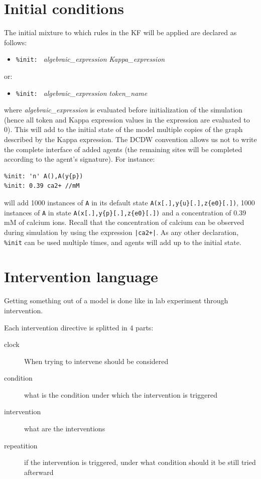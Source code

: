 \documentclass[11pt]{book}
\def\ttt#1{\texttt{#1}}
\def\ITE#1{\begin{itemize}#1\end{itemize}}
\begin{document}
\section{Initial conditions}\label{sec:init}

The initial mixture to which rules in the
KF will be applied are declared as follows: \ITE{
\item[] \ttt{\%init: } \textit{algebraic\_expression} \textit{Kappa\_expression}
}
or:
\ITE{
\item[] \ttt{\%init: }  \textit{algebraic\_expression} \textit{token\_name}
}

where \textit{algebraic\_expression} is evaluated before
initialization of the simulation (hence all token and Kappa expression
values in the expression are evaluated to 0). This will add to the
initial state of the model multiple copies of the graph described by
the Kappa expression. The DCDW convention allows us not to write the complete interface of added agents
(the remaining sites will be completed according to the agent's
signature). For instance:
\begin{lstlisting}[language=kappa]
%var: 'n' 1000
%init: 'n' A(),A(y{p})
%init: 0.39 ca2+ //mM
\end{lstlisting}
will add 1000 instances of \ttt{A} in its default state
\ttt{A(x[.],y\{u\}[.],z\{e0\}[.])}, 1000 instances of \ttt{A} in
state \ttt{A(x[.],y\{p\}[.],z\{e0\}[.])} and a concentration of 0.39
mM of calcium ions. Recall that the concentration of calcium can be
observed during simulation by using the expression \ttt{|ca2+|}.  As
any other declaration, \ttt{\%init} can be used
multiple times, and agents will add up to the initial state.

\section{Intervention language}\label{sec:mod}
Getting something out of a model is done like in lab experiment
through intervention.

Each intervention directive is splitted in 4 parts:
\begin{description}
\item[clock] When trying to intervene should be considered
\item[condition] what is the condition under which the intervention is triggered
\item[intervention] what are the interventions
\item[repeatition] if the intervention is triggered, under what
  condition should it be still tried afterward
\end{description}
\end{document}
